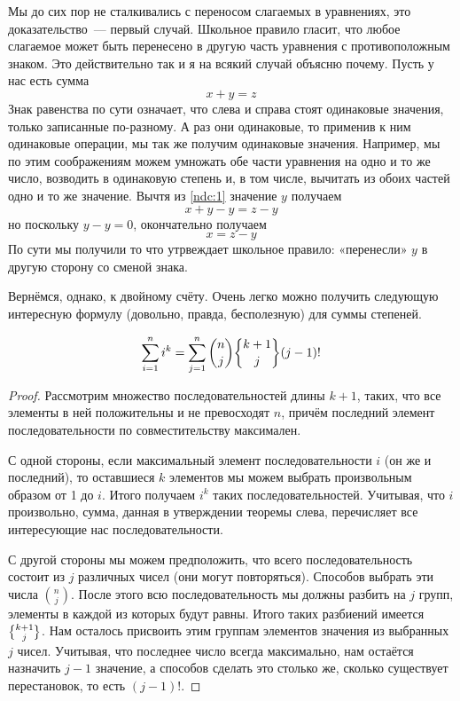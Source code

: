 Мы до сих пор не сталкивались с переносом слагаемых в уравнениях, это доказательство~— первый случай. Школьное правило гласит, что любое слагаемое может быть перенесено в другую часть уравнения с противоположным знаком. Это действительно так и я на всякий случай объясню почему. Пусть у нас есть сумма
\begin{equation}\label{ndc:1}
x+y = z
\end{equation}
Знак равенства по сути означает, что слева и справа стоят одинаковые значения, только записанные по-разному. А раз они одинаковые, то применив к ним одинаковые операции, мы так же получим одинаковые значения. Например, мы по этим соображениям можем умножать обе части уравнения на одно и то же число, возводить в одинаковую степень и, в том числе, вычитать из обоих частей одно и то же значение. Вычтя из \eqref{ndc:1} значение $y$ получаем
$$x + y - y = z - y$$
но поскольку $y-y=0$, окончательно получаем
$$x = z - y$$
По сути мы получили то что утрвеждает школьное правило: «перенесли» $y$ в другую сторону со сменой знака.

Вернёмся, однако, к двойному счёту. Очень легко можно получить следующую интересную формулу (довольно, правда, бесполезную) для суммы степеней.

\begin{thm}
$$\sum_{i=1}^n i^k = \sum_{j=1}^n {n \choose j}\sstirling{k+1}{j}(j-1)!$$
\end{thm}
\begin{proof}
Рассмотрим множество последовательностей длины $k+1$, таких, что все элементы в ней положительны и не превосходят $n$, причём последний элемент последовательности по совместительству максимален.

С одной стороны, если максимальный элемент последовательности $i$ (он же и последний), то оставшиеся $k$ элементов мы можем выбрать произвольным образом от 1 до $i$. Итого получаем $i^k$ таких последовательностей. Учитывая, что $i$ произвольно, сумма, данная в утверждении теоремы слева, перечисляет все интересующие нас последовательности.

С другой стороны мы можем предположить, что всего последовательность состоит из $j$ различных чисел (они могут повторяться). Способов выбрать эти числа $n\choose j$. После этого всю последовательность мы должны разбить на $j$ групп, элементы в каждой из которых будут равны. Итого таких разбиений имеется $\sstirling{k+1}{j}$. Нам осталось присвоить этим группам элементов значения из выбранных $j$ чисел. Учитывая, что последнее число всегда максимально, нам остаётся назначить $j-1$ значение, а способов сделать это столько же, сколько существует перестановок, то есть $(j-1)!$.
\end{proof}

